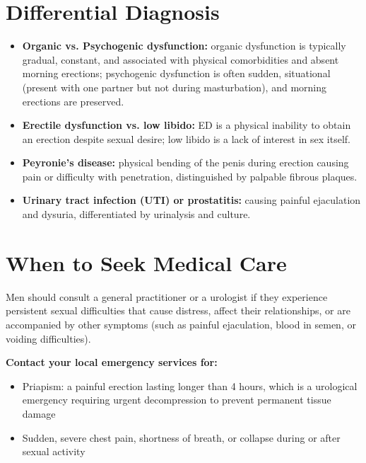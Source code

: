 \section*{Differential Diagnosis}
\begin{itemize}
    \item \textbf{Organic vs. Psychogenic dysfunction:} organic dysfunction is typically gradual, constant, and associated with physical comorbidities and absent morning erections; psychogenic dysfunction is often sudden, situational (present with one partner but not during masturbation), and morning erections are preserved.
    \item \textbf{Erectile dysfunction vs. low libido:} ED is a physical inability to obtain an erection despite sexual desire; low libido is a lack of interest in sex itself.
    \item \textbf{Peyronie's disease:} physical bending of the penis during erection causing pain or difficulty with penetration, distinguished by palpable fibrous plaques.
    \item \textbf{Urinary tract infection (UTI) or prostatitis:} causing painful ejaculation and dysuria, differentiated by urinalysis and culture.
\end{itemize}

\section*{When to Seek Medical Care}
Men should consult a general practitioner or a urologist if they experience persistent sexual difficulties that cause distress, affect their relationships, or are accompanied by other symptoms (such as painful ejaculation, blood in semen, or voiding difficulties).

\textbf{Contact your local emergency services for:}
\begin{itemize}
    \item Priapism: a painful erection lasting longer than 4 hours, which is a urological emergency requiring urgent decompression to prevent permanent tissue damage
    \item Sudden, severe chest pain, shortness of breath, or collapse during or after sexual activity
\end{itemize}


